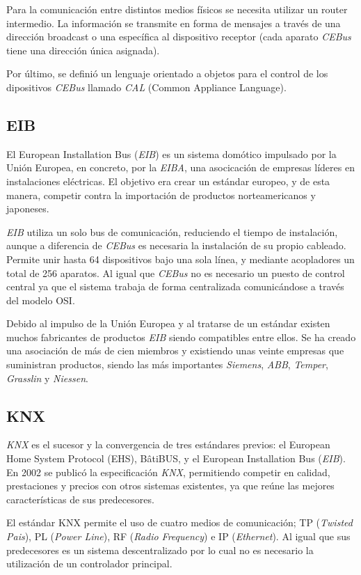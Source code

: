 Para la comunicación entre distintos medios físicos se necesita utilizar un router intermedio. La información se transmite en forma de mensajes a través de una dirección broadcast o una específica al dispositivo receptor (cada aparato \emph{CEBus} tiene una dirección única asignada).

Por último, se definió un lenguaje orientado a objetos para el control de los dipositivos \emph{CEBus} llamado \emph{CAL} (Common Appliance Language).

\subsection{EIB}

El European Installation Bus (\emph{EIB}) es un sistema domótico impulsado por la Unión Europea, en concreto, por la \emph{EIBA}, una asocicación de empresas líderes en instalaciones eléctricas. El objetivo era crear un estándar europeo, y de esta manera, competir contra la importación de productos norteamericanos y japoneses.

\emph{EIB} utiliza un solo bus de comunicación, reduciendo el tiempo de instalación, aunque a diferencia de \emph{CEBus} es necesaria la instalación de su propio cableado. Permite unir hasta 64 dispositivos bajo una sola línea, y mediante acopladores un total de 256 aparatos. Al igual que \emph{CEBus} no es necesario un puesto de control central ya que el sistema trabaja de forma centralizada comunicándose a través del modelo OSI.

Debido al impulso de la Unión Europea y al tratarse de un estándar existen muchos fabricantes de productos \emph{EIB} siendo compatibles entre ellos. Se ha creado una asociación de más de cien miembros y existiendo unas veinte empresas que suministran productos, siendo las más importantes \emph{Siemens}, \emph{ABB}, \emph{Temper}, \emph{Grasslin} y \emph{Niessen}.

\subsection{KNX}

\emph{KNX} es el sucesor y la convergencia de tres estándares previos: el European Home System Protocol (EHS), BâtiBUS, y el European Installation Bus (\emph{EIB}). En 2002 se publicó la especificación \emph{KNX}, permitiendo competir en calidad, prestaciones y precios con otros sistemas existentes, ya que reúne las mejores características de sus predecesores.


El estándar KNX permite el uso de cuatro medios de comunicación; TP (\emph{Twisted Pais}), PL (\emph{Power Line}), RF (\emph{Radio Frequency}) e IP (\emph{Ethernet}). Al igual que sus predecesores es un sistema descentralizado por lo cual no es necesario la utilización de un controlador principal.